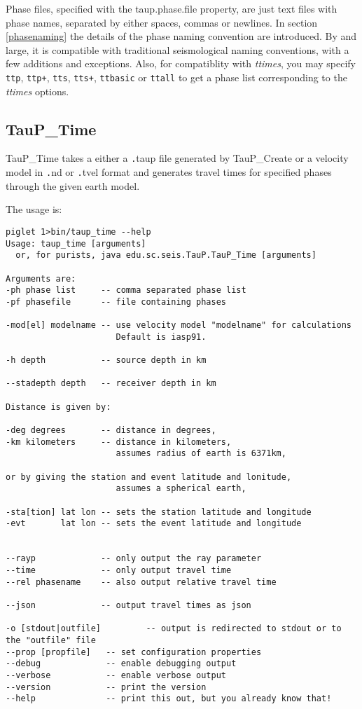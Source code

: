 Phase files, specified with the taup.phase.file property,
 are just text files with phase names, separated by either 
spaces, commas or newlines. In section \ref{phasenaming} the details of 
the phase naming convention are introduced. 
By and large, it is compatible with traditional 
seismological naming conventions, with a few additions and exceptions.
Also, for compatiblity with \textit{ttimes}, you may specify 
\texttt{ttp}, \texttt{ttp+}, \texttt{tts}, \texttt{tts+},
\texttt{ttbasic} or \texttt{ttall} to get a phase list corresponding 
to the \textit{ttimes} options.

\subsection{TauP\_Time}
TauP\_Time takes a either a {\texttt .taup} file generated by TauP\_Create or a velocity model in
{\texttt .nd} or {\texttt .tvel} format and generates 
travel times for specified phases through the given earth model. 

The usage is:
\begin{verbatim}
piglet 1>bin/taup_time --help
Usage: taup_time [arguments]
  or, for purists, java edu.sc.seis.TauP.TauP_Time [arguments]

Arguments are:
-ph phase list     -- comma separated phase list
-pf phasefile      -- file containing phases

-mod[el] modelname -- use velocity model "modelname" for calculations
                      Default is iasp91.

-h depth           -- source depth in km

--stadepth depth   -- receiver depth in km

Distance is given by:

-deg degrees       -- distance in degrees,
-km kilometers     -- distance in kilometers,
                      assumes radius of earth is 6371km,

or by giving the station and event latitude and lonitude,
                      assumes a spherical earth,

-sta[tion] lat lon -- sets the station latitude and longitude
-evt       lat lon -- sets the event latitude and longitude


--rayp             -- only output the ray parameter
--time             -- only output travel time
--rel phasename    -- also output relative travel time

--json             -- output travel times as json

-o [stdout|outfile]         -- output is redirected to stdout or to the "outfile" file
--prop [propfile]   -- set configuration properties
--debug             -- enable debugging output
--verbose           -- enable verbose output
--version           -- print the version
--help              -- print this out, but you already know that!
\end{verbatim} 

